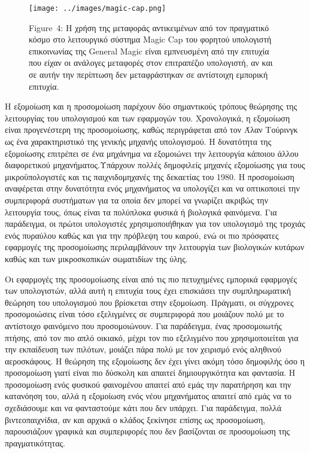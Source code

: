 \documentclass[
]{article}
\begin{document}
\leavevmode{}%
\begin{figure}
\hypertarget{fig:magic-cap}{%
\centering
\texttt{[image: ../images/magic-cap.png]}
\caption{Figure~4: Η χρήση της μεταφοράς αντικειμένων από τον πραγματικό
κόσμο στο λειτουργικό σύστημα Magic Cap του φορητού υπολογιστή
επικοινωνίας της General Magic είναι εμπνευσμένη από την επιτυχία που
είχαν οι ανάλογες μεταφορές στον επιτραπέζιο υπολογιστή, αν και σε αυτήν
την περίπτωση δεν μεταφράστηκαν σε αντίστοιχη εμπορική
επιτυχία.}\label{fig:magic-cap}
}
\end{figure}

Η εξομοίωση και η προσομοίωση παρέχουν δύο σημαντικούς τρόπους θεώρησης
της λειτουργίας του υπολογισμού και των εφαρμογών του. Χρονολογικά, η
εξομοίωση είναι προγενέστερη της προσομοίωσης, καθώς περιγράφεται από
τον Άλαν Τούρινγκ ως ένα χαρακτηριστικό της γενικής μηχανής υπολογισμού.
Η δυνατότητα της εξομοίωσης επιτρέπει σε ένα μηχάνημα να εξομοιώνει την
λειτουργία κάποιου άλλου διαφορετικού μηχανήματος.Υπάρχουν πολλές
δημοφιλείς μηχανές εξομοίωσης για τους μικροϋπολογιστές και τις
παιχνιδομηχανές της δεκαετίας του 1980. Η προσομοίωση αναφέρεται στην
δυνατότητα ενός μηχανήματος να υπολογίζει και να οπτικοποιεί την
συμπεριφορά συστήματων για τα οποία δεν μπορεί να γνωρίζει ακριβώς την
λειτουργία τους, όπως είναι τα πολύπλοκα φυσικά ή βιολογικά φαινόμενα.
Για παράδειγμα, οι πρώτοι υπολογιστές χρησιμοποιήθηκαν για τον
υπολογισμό της τροχιάς ενός πυραύλου καθώς και για την πρόβλεψη του
καιρού, ενώ οι πιο πρόσφατες εφαρμογές της προσομοίωσης περιλαμβάνουν
την λειτουργία των βιολογικών κυτάρων καθώς και των μικροσκοπικών
σωματιδίων της ύλης.

Οι εφαρμογές της προσομοίωσης είναι από τις πιο πετυχημένες εμπορικά
εφαρμογές των υπολογιστών, αλλά αυτή η επιτυχία τους έχει επισκιάσει την
συμπληρωματική θεώρηση του υπολογισμού που βρίσκεται στην εξομοίωση.
Πράγματι, οι σύγχρονες προσομοιώσεις είναι τόσο εξελιγμένες σε
συμπεριφορά που μοιάζουν πολύ με το αντίστοιχο φαινόμενο που
προσομοιώνουν. Για παράδειγμα, ένας προσομοιωτής πτήσης, από τον πιο
απλό οικιακό, μέχρι τον πιο εξελιγμένο που χρησιμοποιείται για την
εκπαίδευση των πιλότων, μοιάζει πάρα πολύ με τον χειρισμό ενός αληθινού
αεροσκάφους. H θεώρηση της εξομοίωσης δεν έχει γίνει ακόμη τόσο
δημοφιλής όσο η προσομοίωση γιατί είναι πιο δύσκολη και απαιτεί
δημιουργικότητα και φαντασία. Η προσομοίωση ενός φυσικού φαινομένου
απαιτεί από εμάς την παρατήρηση και την κατανόηση του, αλλά η εξομοίωση
ενός νέου μηχανήματος απαιτεί από εμάς να το σχεδιάσουμε και να
φανταστούμε κάτι που δεν υπάρχει. Για παράδειγμα, πολλά βιντεοπαιχνίδια,
αν και αρχικά ο κλάδος ξεκίνησε επίσης ως προσομοίωση, παρουσιάζουν
γραφικά και συμπεριφορές που δεν βασίζονται σε προσομοίωση της
πραγματικότητας.
\end{document}
